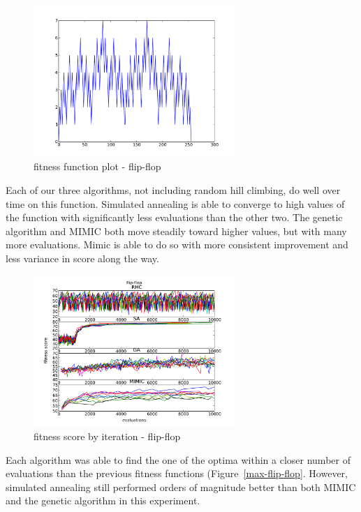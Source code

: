 \documentclass{sig-alternate}
\begin{document}
\begin{figure}[!htbp]
    \centering
    \includegraphics[width=3in]{part1.2/flip-flop-plot.pdf}
    \caption{fitness function plot - flip-flop\label{plot-flip-flop}}
\end{figure} 

Each of our three algorithms, not including random hill climbing, do well over time on this function. Simulated annealing is able to converge to high values of the function with significantly less evaluations than the other two. The genetic algorithm and MIMIC both move steadily toward higher values, but with many more evaluations. Mimic is able to do so with more consistent improvement and less variance in score along the way.

\begin{figure}[!htbp]
    \centering
    \includegraphics[width=3in]{part1.2/flip-flop-over-time.pdf}
    \caption{fitness score by iteration - flip-flop\label{over-time-flip-flop}}
\end{figure} 

Each algorithm was able to find the one of the optima within a closer number of evaluations than the previous fitness functions (Figure~\ref{max-flip-flop}. However, simulated annealing still performed orders of magnitude better than both MIMIC and the genetic algorithm in this experiment. 
\end{document}
